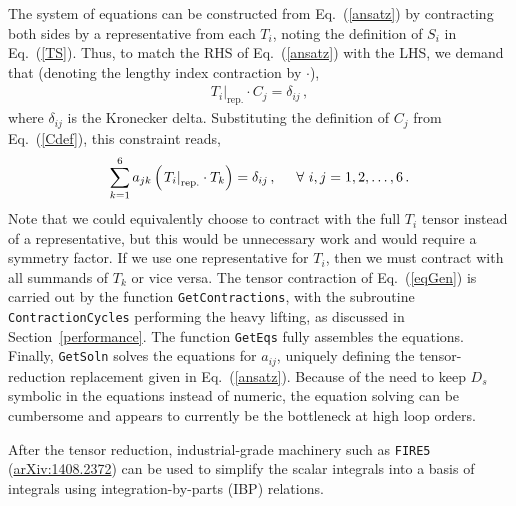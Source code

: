\documentclass[aps,prd,preprint,eqsecnum,tightenlines,nofootinbib,showpacs]{revtex4}
\def\eqn#1{Eq.~({\ref{#1}})}
\def\sect#1{Section~{\ref{#1}}}
\begin{document}
The system of equations can be constructed from \eqn{ansatz} by contracting both sides by 
a representative from each $T_{i}$, noting the definition of $S_{i}$ in \eqn{TS}.
Thus, to match the RHS of \eqn{ansatz} with the LHS, we demand that (denoting the lengthy index 
contraction by $\cdot$),
%
\begin{align}
\left.T_{i}\right|_{\text{rep.}}\cdot C_{j} = \delta_{ij}\,,
\end{align}
where $\delta_{ij}$ is the Kronecker delta. Substituting the definition of $C_{j}$ from \eqn{Cdef}, this constraint reads,
\begin{align}
\sum_{k=1}^{6}a_{jk}\left(\left.T_{i}\right|_{\text{rep.}}\cdot T_{k}\right) = \delta_{ij}\,,
\hspace{.5cm}
\forall\,\, i,j = 1,2,\ldots, 6\,.
\label{eqGen}
\end{align}
%
Note that we could equivalently choose to contract with the full $T_{i}$ tensor instead of a representative,
but this would be unnecessary work and would require a symmetry factor. If we use one representative
for $T_{i}$, then we must contract with all summands of $T_{k}$ or vice versa. The tensor contraction
of \eqn{eqGen} is carried out by the function \texttt{GetContractions}, with the subroutine
\texttt{ContractionCycles} performing the heavy lifting, as discussed in \sect{performance}. The function
\texttt{GetEqs} fully assembles the equations. Finally, \texttt{GetSoln} solves the equations for $a_{ij}$, 
uniquely defining the tensor-reduction replacement given in \eqn{ansatz}. Because of the need to keep $D_{s}$ symbolic in the equations instead of numeric, the equation solving can be cumbersome
and appears to currently be the bottleneck at high loop orders.

After the tensor reduction, industrial-grade machinery such as \texttt{FIRE5}
(\href{https://arxiv.org/abs/1408.2372}{arXiv:1408.2372}) can be used to simplify the scalar integrals
into a basis of integrals using integration-by-parts (IBP) relations.
\end{document}

